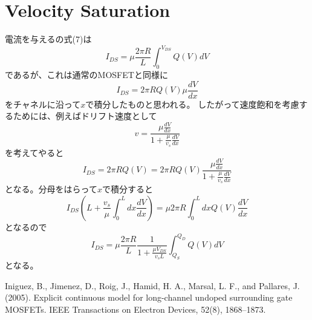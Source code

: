 \documentclass[11pt,uplatex,a4paper]{jsarticle}
\def\d#1#2{\frac{d #1}{d #2}}
\begin{document}
\section{Velocity Saturation}
電流を与える\cite{Iniguez:2005ub}の式(7)は
\begin{equation}
 I_{DS} = \mu \frac{2 \pi R}{L}\int_0^{V_{DS}} Q(V) dV
\end{equation}
であるが、これは通常のMOSFETと同様に
\begin{equation}
 I_{DS} = 2 \pi R Q(V) \mu \d{V}{x}
\end{equation}
をチャネルに沿って$x$で積分したものと思われる。
したがって速度飽和を考慮するためには、例えばドリフト速度として
\begin{equation}
 v = \frac{\mu \d{V}{x}}{1+\frac{\mu}{v_s}\d{V}{x}}
\end{equation}
を考えてやると
\begin{equation}
 I_{DS} = 2 \pi R Q(V)  = 2 \pi R Q(V) \frac{\mu \d{V}{x}}{1+\frac{\mu}{v_s}\d{V}{x}}
\end{equation}
となる。分母をはらって$x$で積分すると
\begin{equation}
 I_{DS} (L +  \frac{v_s}{\mu} \int_0^{L} dx \d{V}{x})
  = \mu 2 \pi R \int_0^{L} dx Q(V) \d{V}{x}
\end{equation}
となるので
\begin{equation}
 I_{DS} = \mu \frac{2 \pi R}{L} \frac{1}{{1 + \frac{\mu V_{DS}}{v_s L}}}
  \int_{Q_S}^{Q_D} Q(V) dV
\end{equation}
となる。

\appendix

 \begin{thebibliography}{99}
		  Iniguez, B., Jimenez, D., Roig, J., Hamid, H. A., Marsal, L. F., and Pallares, J. (2005). Explicit continuous model for long-channel undoped surrounding gate MOSFETs. IEEE Transactions on Electron Devices, 52(8), 1868–1873.     
 \end{thebibliography}
\end{document}
